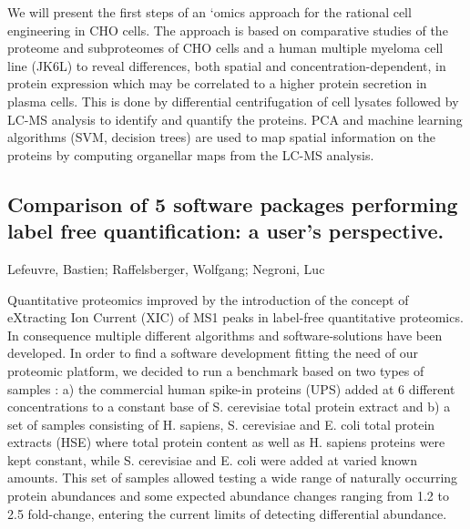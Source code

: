 {We will present the first steps of an ‘omics approach for the rational cell engineering in CHO cells. The approach is based on comparative studies of the proteome and subproteomes of CHO cells and a human multiple myeloma cell line (JK6L) to reveal differences, both spatial and concentration-dependent, in protein expression which may be correlated to a higher protein secretion in plasma cells. This is done by differential centrifugation of cell lysates followed by LC-MS analysis to identify and quantify the proteins. PCA and machine learning algorithms (SVM, decision trees) are used to map spatial information on the proteins by computing organellar maps from the LC-MS analysis.


\subsection*{\color{eubicRed} Comparison of 5 software packages performing label free quantification: a user’s perspective.}
{\color{eubicGray} Lefeuvre, Bastien;
Raffelsberger, Wolfgang;
Negroni, Luc}

Quantitative proteomics improved by the introduction of the concept of eXtracting Ion Current (XIC) of MS1 peaks in label-free quantitative proteomics. In consequence multiple different algorithms and software-solutions have been developed. In order to find a software development fitting the need of our proteomic platform, we decided to run a benchmark based on two types of samples : a) the commercial human spike-in proteins (UPS) added at 6 different concentrations to a constant base of S. cerevisiae total protein extract and b) a set of samples consisting of H. sapiens, S. cerevisiae and E. coli total protein extracts (HSE) where total protein content as well as H. sapiens proteins were kept constant, while S. cerevisiae and E. coli were added at varied known amounts. This set of samples allowed testing a wide range of naturally occurring protein abundances and some expected abundance changes ranging from 1.2 to 2.5 fold-change, entering the current limits of detecting differential abundance.

}

